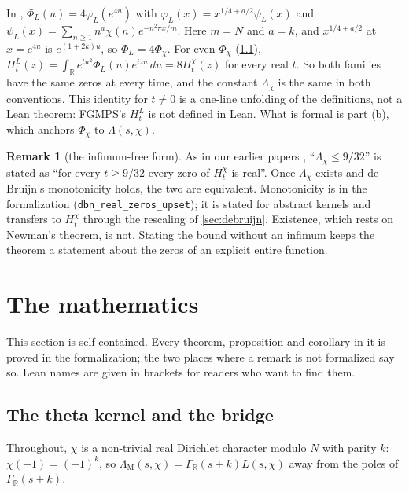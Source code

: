 \documentclass[11pt]{article}
\theoremstyle{definition}
\newtheorem{remark}[theorem]{Remark}
\newcommand{\lean}[1]{\texttt{#1}}
\newcommand{\R}{\mathbb{R}}
\newcommand{\GR}{\Gamma_{\mathbb{R}}}
\newcommand{\Lc}{\Lambda}
\begin{document}
In \cite[(1.3)]{FGMPS2026}, $\Phi_L(u) = 4\varphi_L(e^{4u})$ with $\varphi_L(x) = x^{1/4+a/2}\psi_L(x)$ and $\psi_L(x) = \sum_{n\ge1}n^a\chi(n)e^{-n^2\pi x/m}$. Here $m = N$ and $a = k$, and $x^{1/4 + a/2}$ at $x = e^{4u}$ is $e^{(1+2k)u}$, so $\Phi_L = 4\Phi_\chi$. For even $\Phi_\chi$ (\cref{sec:theta}), $H^L_t(z) = \int_\R e^{tu^2}\Phi_L(u)e^{izu}\,du = 8H^\chi_t(z)$ for every real $t$. So both families have the same zeros at every time, and the constant $\Lc_\chi$ is the same in both conventions. This identity for $t \ne 0$ is a one-line unfolding of the definitions, not a Lean theorem: FGMPS's $H^L_t$ is not defined in Lean. What is formal is part (b), which anchors $\Phi_\chi$ to $\Lc(s,\chi)$.

\begin{remark}[the infimum-free form]\label{rem:sinf}
As in our earlier papers \cite{Murphy932,MurphyNewman}, ``$\Lc_\chi \le 9/32$'' is stated as ``for every $t \ge 9/32$ every zero of $H^\chi_t$ is real''. Once $\Lc_\chi$ exists and de Bruijn's monotonicity holds, the two are equivalent. Monotonicity is in the formalization (\lean{dbn\_\allowbreak{}real\_\allowbreak{}zeros\_\allowbreak{}upset}); it is stated for abstract kernels and transfers to $H^\chi_t$ through the rescaling of \cref{sec:debruijn}. Existence, which rests on Newman's theorem, is not. Stating the bound without an infimum keeps the theorem a statement about the zeros of an explicit entire function.
\end{remark}

\section{The mathematics}\label{sec:math}

This section is self-contained. Every theorem, proposition and corollary in it is proved in the formalization; the two places where a remark is not formalized say so. Lean names are given in brackets for readers who want to find them.

\subsection{The theta kernel and the bridge}\label{sec:theta}

Throughout, $\chi$ is a non-trivial real Dirichlet character modulo $N$ with parity $k$: $\chi(-1) = (-1)^k$, so $\Lc_{\mathrm{M}}(s,\chi) = \GR(s+k)L(s,\chi)$ away from the poles of $\GR(s+k)$.
\end{document}
